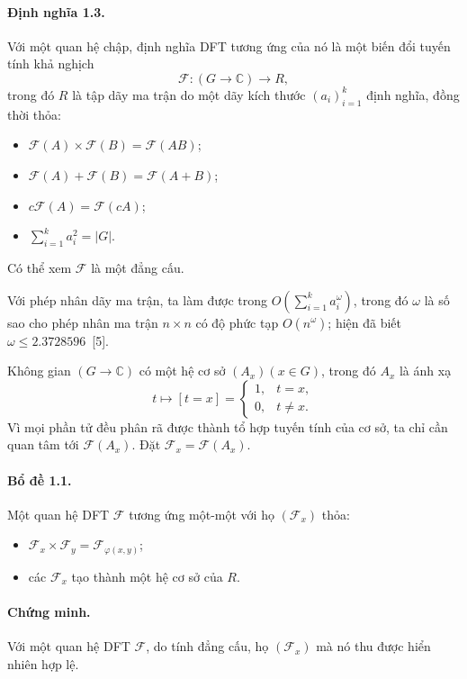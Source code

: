 \documentclass[11pt]{article}
\begin{document}
\paragraph{Định nghĩa 1.3.}
Với một quan hệ chập, định nghĩa DFT tương ứng của nó là một biến đổi tuyến tính
khả nghịch
\[
  \mathcal F:(G\to\mathbb C)\to R,
\]
trong đó $R$ là tập dãy ma trận do một dãy kích thước $(a_i)_{i=1}^{k}$ định
nghĩa, đồng thời thỏa:
\begin{itemize}
  \item $\mathcal F(A)\times\mathcal F(B)=\mathcal F(AB)$;
  \item $\mathcal F(A)+\mathcal F(B)=\mathcal F(A+B)$;
  \item $c\mathcal F(A)=\mathcal F(cA)$;
  \item $\sum_{i=1}^{k}a_i^2=|G|$.
\end{itemize}
Có thể xem $\mathcal F$ là một đẳng cấu.

Với phép nhân dãy ma trận, ta làm được trong
$O(\sum_{i=1}^{k}a_i^\omega)$, trong đó $\omega$ là số sao cho phép nhân ma
trận $n\times n$ có độ phức tạp $O(n^\omega)$; hiện đã biết
$\omega\le 2.3728596$~[5].

Không gian $(G\to\mathbb C)$ có một hệ cơ sở $(A_x)(x\in G)$, trong đó
$A_x$ là ánh xạ
\[
  t\mapsto [t=x]=
  \begin{cases}
    1,& t=x,\\
    0,& t\ne x.
  \end{cases}
\]
Vì mọi phần tử đều phân rã được thành tổ hợp tuyến tính của cơ sở, ta chỉ cần
quan tâm tới $\mathcal F(A_x)$. Đặt $\mathcal F_x=\mathcal F(A_x)$.

\paragraph{Bổ đề 1.1.}
Một quan hệ DFT $\mathcal F$ tương ứng một-một với họ $(\mathcal F_x)$ thỏa:
\begin{itemize}
  \item $\mathcal F_x\times\mathcal F_y=\mathcal F_{\varphi(x,y)}$;
  \item các $\mathcal F_x$ tạo thành một hệ cơ sở của $R$.
\end{itemize}

\paragraph{Chứng minh.}
Với một quan hệ DFT $\mathcal F$, do tính đẳng cấu, họ $(\mathcal F_x)$ mà nó
thu được hiển nhiên hợp lệ.
\end{document}
